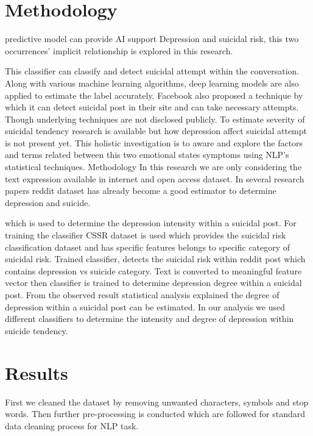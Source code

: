 \documentclass[12pt, letterpaper]{article}
\begin{document}
\section{Methodology}\label{sec2}

predictive model can provide AI support Depression and suicidal risk, this two occurrences’ implicit relationship is explored in this research.

 This classifier can classify and detect suicidal attempt within the conversation. Along with various machine learning algorithms, deep learning models are also applied to estimate the label accurately. Facebook also proposed a technique by which it can detect suicidal post in their site and can take necessary attempts. Though underlying techniques are not disclosed publicly. To estimate severity of suicidal tendency research is available but how depression affect suicidal attempt is not present yet. This holistic investigation is to aware and explore the factors and terms related between this two emotional states symptoms using NLP’s statistical techniques. 
Methodology
In this research we are only considering the text expression available in internet and open access dataset. In several research papers reddit dataset has already become a good estimator to determine depression and suicide. 

which is used to determine the depression intensity within a suicidal post. 
For training the classifier CSSR dataset is used which provides the suicidal risk classification dataset and has specific features belongs to specific category of suicidal risk. Trained classifier, detects the suicidal risk within reddit post which contains depression vs suicide category. Text is converted to meaningful feature vector then classifier is trained to determine depression degree within a suicidal post. From the observed result statistical analysis explained the degree of depression within a suicidal post can be estimated.  In our analysis we used different classifiers to determine the intensity and degree of depression within suicide tendency. 




\section{Results}\label{sec2}


First we cleaned the dataset by removing unwanted characters, symbols and stop words. Then further pre-processing is conducted which are followed for standard data cleaning process for NLP task. 
\end{document}
